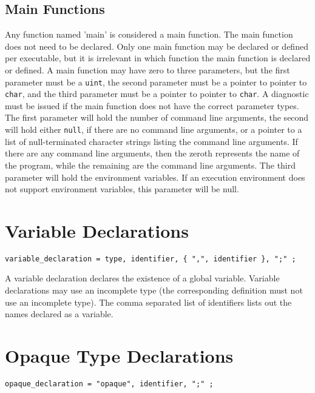 \documentclass[letterpaper,12pt]{book}
\begin{document}
\subsection{Main Functions}

Any function named 'main' is considered a main function. The main function does not need to be declared. Only one main function may be declared or defined per executable, but it is irrelevant in which function the main function is declared or defined. A main function may have zero to three parameters, but the first parameter must be a \texttt{uint}, the second parameter must be a pointer to pointer to \texttt{char}, and the third parameter must be a pointer to pointer to \texttt{char}. A diagnostic must be issued if the main function does not have the correct parameter types. The first parameter will hold the number of command line arguments, the second will hold either \texttt{null}, if there are no command line arguments, or a pointer to a list of null-terminated character strings listing the command line arguments. If there are any command line arguments, then the zeroth represents the name of the program, while the remaining are the command line arguments. The third parameter will hold the environment variables. If an execution environment does not support environment variables, this parameter will be null.

\section{Variable Declarations}

\begin{lstlisting}[breaklines=true]
variable_declaration = type, identifier, { ",", identifier }, ";" ;
\end{lstlisting}

A variable declaration declares the existence of a global variable. Variable declarations may use an incomplete type (the corresponding definition must not use an incomplete type). The comma separated list of identifiers lists out the names declared as a variable.

\section{Opaque Type Declarations}

\begin{lstlisting}[breaklines=true]
opaque_declaration = "opaque", identifier, ";" ;
\end{lstlisting}
\end{document}

